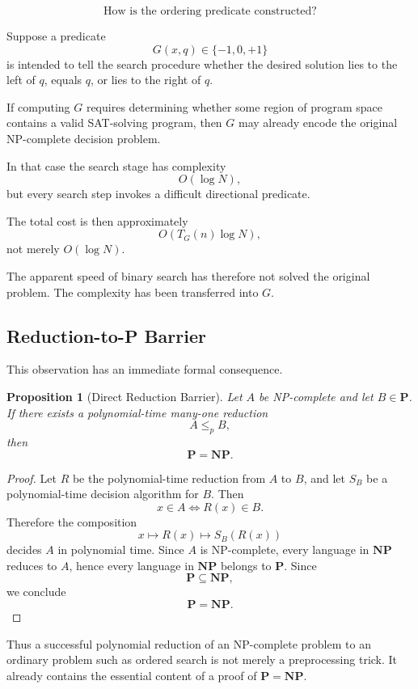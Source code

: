 \documentclass[11pt]{article}
\theoremstyle{plain}
\newtheorem{proposition}[theorem]{Proposition}
\theoremstyle{definition}
\begin{document}
\[
    \boxed{
    \text{How is the ordering predicate constructed?}
    }
\]

Suppose a predicate
\[
    G(x,q)\in\{-1,0,+1\}
\]
is intended to tell the search procedure whether the desired solution lies
to the left of \(q\), equals \(q\), or lies to the right of \(q\).

If computing \(G\) requires determining whether some region of program space
contains a valid SAT-solving program, then \(G\) may already encode the
original NP-complete decision problem.

In that case the search stage has complexity
\[
    O(\log N),
\]
but every search step invokes a difficult directional predicate.

The total cost is then approximately
\[
    O\!\left(
        T_G(n)\log N
    \right),
\]
not merely \(O(\log N)\).

The apparent speed of binary search has therefore not solved the original
problem.  The complexity has been transferred into \(G\).

\subsection{Reduction-to-P Barrier}

This observation has an immediate formal consequence.

\begin{proposition}[Direct Reduction Barrier]
\label{prop:reduction-to-p-barrier}
Let \(A\) be NP-complete and let \(B\in\mathbf{P}\).  If there exists a
polynomial-time many-one reduction
\[
    A\leq_p B,
\]
then
\[
    \mathbf{P}=\mathbf{NP}.
\]
\end{proposition}

\begin{proof}
Let \(R\) be the polynomial-time reduction from \(A\) to \(B\), and let
\(S_B\) be a polynomial-time decision algorithm for \(B\).  Then
\[
    x\in A
    \iff
    R(x)\in B.
\]
Therefore the composition
\[
    x
    \longmapsto
    R(x)
    \longmapsto
    S_B(R(x))
\]
decides \(A\) in polynomial time.  Since \(A\) is NP-complete, every language
in \(\mathbf{NP}\) reduces to \(A\), hence every language in \(\mathbf{NP}\)
belongs to \(\mathbf{P}\).  Since
\[
    \mathbf{P}\subseteq\mathbf{NP},
\]
we conclude
\[
    \mathbf{P}=\mathbf{NP}.
\]
\end{proof}

Thus a successful polynomial reduction of an NP-complete problem to an
ordinary problem such as ordered search is not merely a preprocessing trick.
It already contains the essential content of a proof of
\(\mathbf{P}=\mathbf{NP}\).
\end{document}
